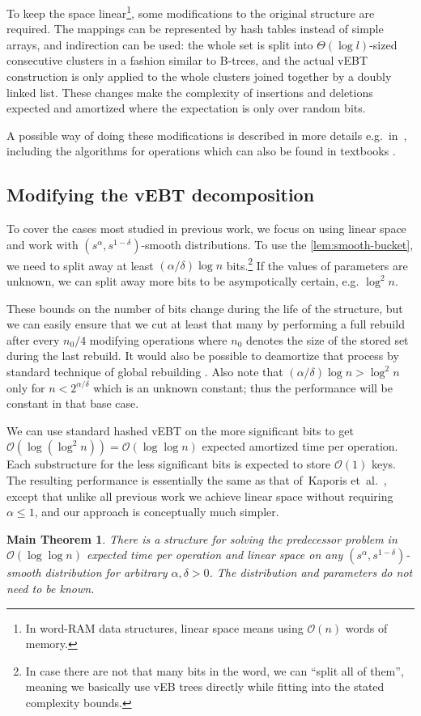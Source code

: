 \documentclass[
submission
]{dmtcs-episciences}
\theoremstyle{plain}
\theoremstyle{definition}
\theoremstyle{remark}
\theoremstyle{plain}
\theoremstyle{plain}
\newtheorem*{thm*}{Main Theorem}
\def\OO{\mathcal O}
\begin{document}
To keep the space linear\footnote{In word-RAM data structures, linear space means using $\OO(n)$ words
of memory.}, some modifications to the original structure are required. The mappings
can be represented by hash tables instead of simple arrays, and indirection
can be used: the whole set is split into $\Theta(\log l)$-sized consecutive
clusters in a fashion similar to B-trees, and the actual vEBT construction
is only applied to the whole clusters joined together by a doubly
linked list. These changes make the complexity of insertions and deletions
expected and amortized where the expectation is only over random bits.

A possible way of doing these modifications is described in more details
e.g.~in~\cite[chapter 4]{Cunat10}, including the algorithms for
operations which can also be found in textbooks \cite[chapter 20]{intro2alg}.

\subsection{Modifying the vEBT decomposition}

To cover the cases most studied in previous work, we focus on using
linear space and work with $\left(s^{\alpha},s^{1-\delta}\right)$-smooth
distributions. To use the \ref{lem:smooth-bucket}, we need to split away at least
$(\alpha/\delta)\log n$ bits.\footnote{In case there are not that many bits in the word, we can ``split
all of them'', meaning we basically use vEB trees directly while
fitting into the stated complexity bounds.} If the values of parameters are unknown, we can split away more bits
to be asympotically certain, e.g. $\log^{2}n$.

These bounds on the number of bits change during the life of the structure,
but we can easily ensure that we cut at least that many by performing
a full rebuild after every $n_{0}/4$ modifying operations where $n_{0}$
denotes the size of the stored set during the last rebuild. It would
also be possible to deamortize that process by standard technique
of global rebuilding \cite{global-rebuilding}. Also note that $\left(\alpha/\delta\right)\log n>\log^{2}n$
only for $n<2^{\alpha/\delta}$ which is an unknown constant; thus
the performance will be constant in that base case.

We can use standard hashed vEBT on the more significant bits to get
$\OO\left(\log\left(\log^{2}n\right)\right)=\OO\left(\log\log n\right)$
expected amortized time per operation. Each substructure for the less
significant bits is expected to store $\OO(1)$ keys. The resulting
performance is essentially the same as that of~Kaporis et~al.~\cite{KMSTTZ06},
except that unlike all previous work we achieve linear space without
requiring $\alpha\le1$, and our approach is conceptually much simpler.
\begin{thm*}%
There is a structure for solving the predecessor problem in $\OO\left(\log\log n\right)$
expected time per operation and linear space on any $\left(s^{\alpha},s^{1-\delta}\right)$-smooth
distribution for arbitrary $\alpha,\delta>0$. The distribution and
parameters do not need to be known.
\end{thm*}
\end{document}
